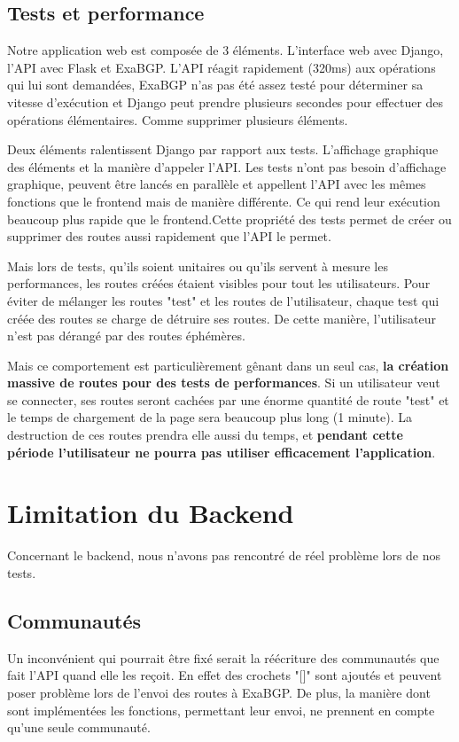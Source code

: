 \subsection{Tests et performance}

Notre application web est composée de 3 éléments.
L'interface web avec Django, l'API avec Flask et ExaBGP. L'API réagit rapidement (320ms) aux opérations qui lui sont demandées, ExaBGP n'as pas été assez testé pour déterminer sa vitesse d'exécution et Django peut prendre plusieurs secondes pour effectuer des opérations élémentaires. Comme supprimer plusieurs éléments.\newline

Deux éléments ralentissent Django par rapport aux tests. L'affichage graphique des éléments et la manière d'appeler l'API.
Les tests n'ont pas besoin d'affichage graphique, peuvent être lancés en parallèle et appellent l'API avec les mêmes fonctions que le frontend mais de manière différente.
Ce qui rend leur exécution beaucoup plus rapide que le frontend.Cette propriété des tests permet de créer ou supprimer des routes aussi rapidement que l'API le permet.\newline

Mais lors de tests, qu'ils soient unitaires ou qu'ils servent à mesure les performances, les routes créées étaient visibles pour tout les utilisateurs.
Pour éviter de mélanger les routes "test" et les routes de l'utilisateur, chaque test qui créée des routes se charge de détruire ses routes. De cette manière, l'utilisateur n'est pas dérangé par des routes éphémères.\newline

Mais ce comportement est particulièrement gênant dans un seul cas, \textbf{la création massive de routes pour des tests de performances}.
Si un utilisateur veut se connecter, ses routes seront cachées par une énorme quantité de route "test" et le temps de chargement de la page sera beaucoup plus long (1 minute).
La destruction de ces routes prendra elle aussi du temps, et \textbf{pendant cette période l'utilisateur ne pourra pas utiliser efficacement l'application}.

\section{Limitation du Backend}

Concernant le backend, nous n'avons pas rencontré de réel problème lors de nos tests.

\subsection{Communautés}
Un inconvénient qui pourrait être fixé serait la réécriture des communautés que fait l'API quand elle les reçoit. En effet des crochets "[]" sont ajoutés et peuvent poser problème lors de l'envoi des routes à ExaBGP.
De plus, la manière dont sont implémentées les fonctions, permettant leur envoi, ne prennent en compte qu'une seule communauté.


